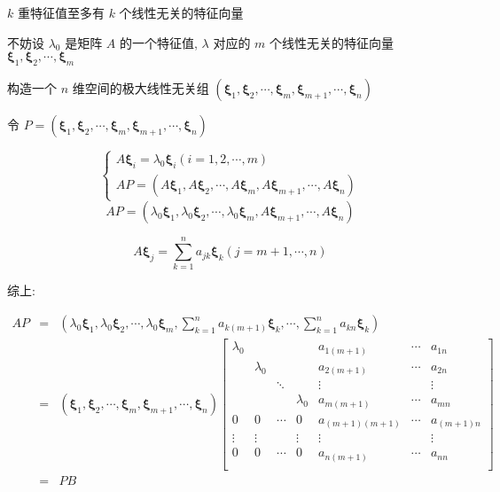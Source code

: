 \begin{theorem}[特征值和特征向量]
	$k$ 重特征值至多有 $k$ 个线性无关的特征向量


	不妨设 $\lambda_{0}$ 是矩阵 $A$ 的一个特征值, $\lambda$ 对应的 $m$ 个线性无关的特征向量 $\boldsymbol{\xi}_{1},\boldsymbol{\xi}_{2},\cdots,\boldsymbol{\xi}_{m}$

	构造一个 $n$ 维空间的极大线性无关组 $(\boldsymbol{\xi}_{1},\boldsymbol{\xi}_{2},\cdots,\boldsymbol{\xi}_{m},\boldsymbol{\xi}_{m+1},\cdots,\boldsymbol{\xi}_{n})$

	令 $P = (\boldsymbol{\xi}_{1},\boldsymbol{\xi}_{2},\cdots,\boldsymbol{\xi}_{m},\boldsymbol{\xi}_{m+1},\cdots,\boldsymbol{\xi}_{n})$

	$$\begin{cases}
		A\boldsymbol{\xi}_{i} = \lambda_{0} \boldsymbol{\xi}_{i} (i = 1,2,\cdots, m)\\
		AP = (A\boldsymbol{\xi}_{1}, A\boldsymbol{\xi}_{2}, \cdots, A\boldsymbol{\xi}_{m}, A\boldsymbol{\xi}_{m+1}, \cdots, A\boldsymbol{\xi}_{n})
	\end{cases}$$
	$$AP = (\lambda_{0} \boldsymbol{\xi}_{1}, \lambda_{0}\boldsymbol{\xi}_{2}, \cdots, \lambda_{0}\boldsymbol{\xi}_{m}, A\boldsymbol{\xi}_{m+1}, \cdots, A\boldsymbol{\xi}_{n})$$
	
	$$A\boldsymbol{\xi}_{j} = \sum\limits_{k = 1}^{n}a_{jk}\boldsymbol{\xi}_{k} (j = m + 1, \cdots, n)$$

	综上:

	\begin{eqnarray*}
		AP & = & (\lambda_{0} \boldsymbol{\xi}_{1},\lambda_{0} \boldsymbol{\xi}_{2},\cdots,\lambda_{0} \boldsymbol{\xi}_{m},\sum\limits_{k=1}^{n}a_{k(m+1)}\boldsymbol{\xi}_{k}, \cdots,\sum\limits_{k=1}^{n}a_{kn}\boldsymbol{\xi}_{k} )\\
			& = & (\boldsymbol{\xi}_{1},\boldsymbol{\xi}_{2},\cdots,\boldsymbol{\xi}_{m},\boldsymbol{\xi}_{m+1},\cdots,\boldsymbol{\xi}_{n})
			\begin{bmatrix}
				\lambda_{0} &             &        &              &  a_{1(m+1)}     & \cdots & a_{1n} \\
							& \lambda_{0} &        &              &  a_{2(m+1)}     & \cdots & a_{2n} \\
							&             & \ddots &              &  \vdots         &        & \vdots \\
							&             &        &  \lambda_{0} &  a_{m(m+1)}     & \cdots & a_{mn} \\
				0           & 0           & \cdots & 0            &  a_{(m+1)(m+1)} & \cdots & a_{(m+1)n}\\
				\vdots      & \vdots      &        & \vdots       &  \vdots         &        & \vdots \\
				0           & 0           & \cdots & 0            &  a_{n(m+1)}     & \cdots & a_{nn}\\
			\end{bmatrix}\\
			& = & PB
	\end{eqnarray*}


\end{theorem}

